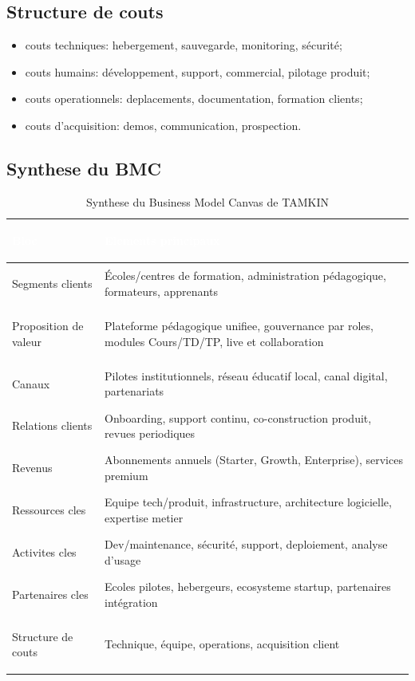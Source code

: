 \documentclass[12pt,a4paper,oneside]{report}
\begin{document}
\subsection{Structure de couts}

\begin{itemize}
  \item couts techniques: hebergement, sauvegarde, monitoring, sécurité;
  \item couts humains: développement, support, commercial, pilotage produit;
  \item couts operationnels: deplacements, documentation, formation clients;
  \item couts d'acquisition: demos, communication, prospection.
\end{itemize}

\subsection{Synthese du BMC}

\renewcommand{\arraystretch}{1.45}
\begin{longtable}{|>{\bfseries\raggedright\arraybackslash}p{3.2cm}|p{10.2cm}|}
\caption{Synthese du Business Model Canvas de TAMKIN}
\label{tab:bmc_edconnect} \\
\hline
\rowcolor{ustoblue}
\textcolor{white}{Bloc} & \textcolor{white}{Elements principaux} \\
\hline
Segments clients & Écoles/centres de formation, administration pédagogique, formateurs, apprenants \\
\hline
Proposition de valeur & Plateforme pédagogique unifiee, gouvernance par roles, modules Cours/TD/TP, live et collaboration \\
\hline
Canaux & Pilotes institutionnels, réseau éducatif local, canal digital, partenariats \\
\hline
Relations clients & Onboarding, support continu, co-construction produit, revues periodiques \\
\hline
Revenus & Abonnements annuels (Starter, Growth, Enterprise), services premium \\
\hline
Ressources cles & Equipe tech/produit, infrastructure, architecture logicielle, expertise metier \\
\hline
Activites cles & Dev/maintenance, sécurité, support, deploiement, analyse d'usage \\
\hline
Partenaires cles & Ecoles pilotes, hebergeurs, ecosysteme startup, partenaires intégration \\
\hline
Structure de couts & Technique, équipe, operations, acquisition client \\
\hline
\end{longtable}
\end{document}
